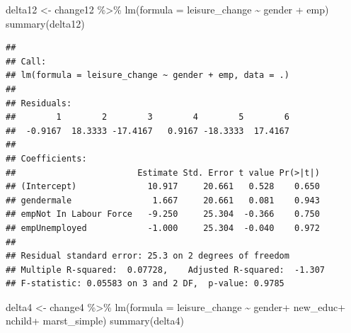 \documentclass[
]{article}
\newenvironment{Shaded}{\begin{snugshade}}{\end{snugshade}}
\newcommand{\AttributeTok}[1]{\textcolor[rgb]{0.77,0.63,0.00}{#1}}
\newcommand{\FunctionTok}[1]{\textcolor[rgb]{0.00,0.00,0.00}{#1}}
\newcommand{\NormalTok}[1]{#1}
\newcommand{\OtherTok}[1]{\textcolor[rgb]{0.56,0.35,0.01}{#1}}
\newcommand{\SpecialCharTok}[1]{\textcolor[rgb]{0.00,0.00,0.00}{#1}}
\begin{document}
\begin{Shaded}
\begin{Highlighting}[]
\NormalTok{delta12 }\OtherTok{\textless{}{-}}\NormalTok{ change12 }\SpecialCharTok{\%\textgreater{}\%}
  \FunctionTok{lm}\NormalTok{(}\AttributeTok{formula =}\NormalTok{ leisure\_change }\SpecialCharTok{\textasciitilde{}}\NormalTok{ gender }\SpecialCharTok{+}\NormalTok{ emp)}
\FunctionTok{summary}\NormalTok{(delta12)}
\end{Highlighting}
\end{Shaded}

\begin{verbatim}
## 
## Call:
## lm(formula = leisure_change ~ gender + emp, data = .)
## 
## Residuals:
##        1        2        3        4        5        6 
##  -0.9167  18.3333 -17.4167   0.9167 -18.3333  17.4167 
## 
## Coefficients:
##                        Estimate Std. Error t value Pr(>|t|)
## (Intercept)              10.917     20.661   0.528    0.650
## gendermale                1.667     20.661   0.081    0.943
## empNot In Labour Force   -9.250     25.304  -0.366    0.750
## empUnemployed            -1.000     25.304  -0.040    0.972
## 
## Residual standard error: 25.3 on 2 degrees of freedom
## Multiple R-squared:  0.07728,    Adjusted R-squared:  -1.307 
## F-statistic: 0.05583 on 3 and 2 DF,  p-value: 0.9785
\end{verbatim}

\begin{Shaded}
\begin{Highlighting}[]
\NormalTok{delta4 }\OtherTok{\textless{}{-}}\NormalTok{ change4 }\SpecialCharTok{\%\textgreater{}\%}
  \FunctionTok{lm}\NormalTok{(}\AttributeTok{formula =}\NormalTok{ leisure\_change }\SpecialCharTok{\textasciitilde{}}\NormalTok{ gender}\SpecialCharTok{+}\NormalTok{ new\_educ}\SpecialCharTok{+}\NormalTok{ nchild}\SpecialCharTok{+}\NormalTok{ marst\_simple)}
\FunctionTok{summary}\NormalTok{(delta4)}
\end{Highlighting}
\end{Shaded}
\end{document}
